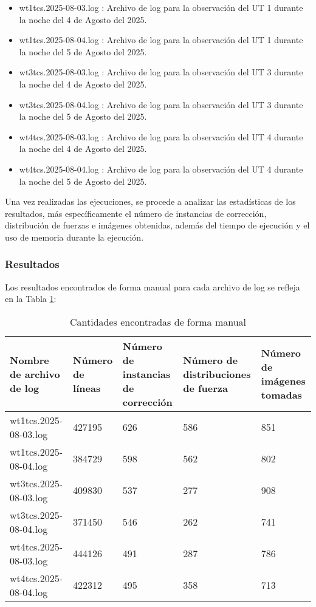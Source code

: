\begin{itemize}
    \item wt1tcs.2025-08-03.log : Archivo de log para la observación del UT 1 durante la noche del 4 de Agosto del 2025.

    \item wt1tcs.2025-08-04.log : Archivo de log para la observación del UT 1 durante la noche del 5 de Agosto del 2025.

    \item wt3tcs.2025-08-03.log : Archivo de log para la observación del UT 3 durante la noche del 4 de Agosto del 2025.

    \item wt3tcs.2025-08-04.log : Archivo de log para la observación del UT 3 durante la noche del 5 de Agosto del 2025.

    \item wt4tcs.2025-08-03.log : Archivo de log para la observación del UT 4 durante la noche del 4 de Agosto del 2025.

    \item wt4tcs.2025-08-04.log : Archivo de log para la observación del UT 4 durante la noche del 5 de Agosto del 2025.    
\end{itemize}

Una vez realizadas las ejecuciones, se procede a analizar las estadísticas de los resultados, más específicamente el número de instancias de corrección, distribución de fuerzas e imágenes obtenidas, además del tiempo de ejecución y el uso de memoria durante la ejecución.

\subsubsection{Resultados}

Los resultados encontrados de forma manual para cada archivo de log se refleja en la Tabla \ref{table:manual}:


\begin{table}[h]
    \centering
    \caption{\label{table:manual} Cantidades encontradas de forma manual}
    \begin{tabular}{|p{2.8cm}|p{2.8cm}|p{2.8cm}|p{2.8cm}|p{2.8cm}|}
        \hline
        Nombre de archivo de log & Número de líneas & Número de instancias de corrección & Número de distribuciones de fuerza & Número de imágenes tomadas \\
        \hline
        wt1tcs.2025-08-03.log & 427195 & 626 & 586 & 851 \\
        \hline
        wt1tcs.2025-08-04.log & 384729 & 598 & 562 & 802 \\
        \hline
        wt3tcs.2025-08-03.log & 409830 & 537 & 277 & 908 \\
        \hline
        wt3tcs.2025-08-04.log & 371450 & 546 & 262 & 741 \\
        \hline
        wt4tcs.2025-08-03.log & 444126 & 491 & 287 & 786 \\
        \hline
        wt4tcs.2025-08-04.log & 422312 & 495 & 358 & 713 \\
        \hline
    \end{tabular}
\end{table}

